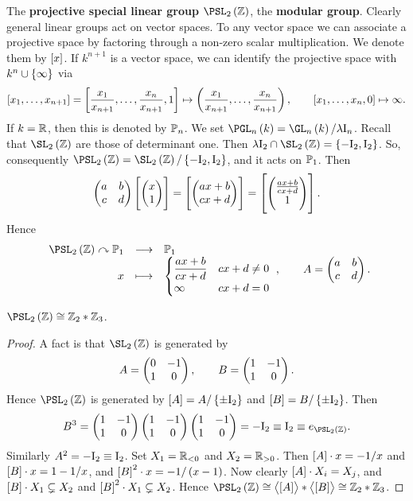 \begin{example}
The \textbf{projective special linear group} $ \PSL_2\br{\ZZ} $, the \textbf{modular group}. Clearly general linear groups act on vector spaces. To any vector space we can associate a projective space by factoring through a non-zero scalar multiplication. We denote them by $ \sbr{x} $. If $ k^{n + 1} $ is a vector space, we can identify the projective space with $ k^n \cup \cbr{\infty} $ via
$$ \sbr{x_1, \dots, x_{n + 1}} = \sbr{\dfrac{x_1}{x_{n + 1}}, \dots, \dfrac{x_n}{x_{n + 1}}, 1} \mapsto \br{\dfrac{x_1}{x_{n + 1}}, \dots, \dfrac{x_n}{x_{n + 1}}}, \qquad \sbr{x_1, \dots, x_n, 0} \mapsto \infty. $$
If $ k = \mathbb{R} $, then this is denoted by $ \mathbb{P}_n $. We set $ \PGL_n\br{k} = \GL_n\br{k} / \lambda\I_n $. Recall that $ \SL_2\br{\ZZ} $ are those of determinant one. Then $ \lambda\I_2 \cap \SL_2\br{\ZZ} = \cbr{-\I_2, \I_2} $. So, consequently $ \PSL_2\br{\ZZ} = \SL_2\br{\ZZ} / \cbr{-\I_2, \I_2} $, and it acts on $ \mathbb{P}_1 $. Then
$$ \twobytwo{a}{b}{c}{d}\sbr{\twobyone{x}{1}} = \sbr{\twobyone{ax + b}{cx + d}} = \sbr{\twobyone{\tfrac{ax + b}{cx + d}}{1}}. $$
Hence
$$ \function{\PSL_2\br{\ZZ} \curvearrowright \PP_1}{\PP_1}{x}{
\begin{cases}
\dfrac{ax + b}{cx + d} & cx + d \ne 0 \\
\infty & cx + d = 0
\end{cases}
}, \qquad A = \twobytwo{a}{b}{c}{d}. $$
\end{example}

\pagebreak

\begin{lemma}
$ \PSL_2\br{\ZZ} \cong \ZZ_2 * \ZZ_3 $.
\end{lemma}


\begin{proof}
A fact is that $ \SL_2\br{\ZZ} $ is generated by
$$ A = \begin{pmatrix} 0 & -1 \\ 1 & 0 \end{pmatrix}, \qquad B = \begin{pmatrix} 1 & -1 \\ 1 & 0 \end{pmatrix}. $$
Hence $ \PSL_2\br{\ZZ} $ is generated by $ \sbr{A} = A / \cbr{\pm\I_2} $ and $ \sbr{B} = B / \cbr{\pm\I_2} $. Then
$$ B^3 = \twobytwo{1}{-1}{1}{0}\twobytwo{1}{-1}{1}{0}\twobytwo{1}{-1}{1}{0} = -\I_2 \equiv \I_2 \equiv e_{\PSL_2\br{\ZZ}}. $$
Similarly $ A^2 = -\mathrm{I}_2 \equiv \mathrm{I}_2 $. Set $ X_1 = \mathbb{R}_{< 0} $ and $ X_2 = \mathbb{R}_{> 0} $. Then $ \sbr{A} \cdot x = -1 / x $ and $ \sbr{B} \cdot x = 1 - 1 / x $, and $ \sbr{B}^2 \cdot x = -1 / \br{x - 1} $. Now clearly $ \sbr{A} \cdot X_i = X_j $, and $ \sbr{B} \cdot X_1 \subsetneq X_2 $ and $ \sbr{B}^2 \cdot X_1 \subsetneq X_2 $. Hence $ \PSL_2\br{\ZZ} \cong \abr{\sbr{A}} * \abr{\sbr{B}} \cong \ZZ_2 * \ZZ_3 $.
\end{proof}

